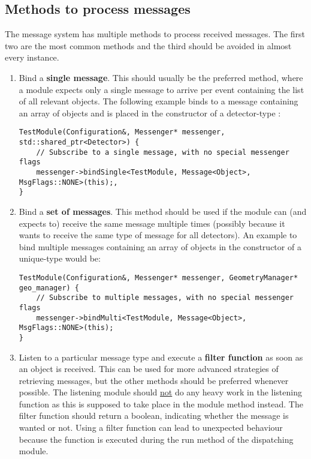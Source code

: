 \subsection{Methods to process messages}
The message system has multiple methods to process received messages.
The first two are the most common methods and the third should be avoided in almost every instance.
\begin{enumerate}
\item Bind a \textbf{single message}.
This should usually be the preferred method, where a module expects only a single message to arrive per event containing the list of all relevant objects.
The following example binds to a message containing an array of objects and is placed in the constructor of a detector-type :
\begin{verbatim}
TestModule(Configuration&, Messenger* messenger, std::shared_ptr<Detector>) {
    // Subscribe to a single message, with no special messenger flags
    messenger->bindSingle<TestModule, Message<Object>, MsgFlags::NONE>(this);,
}
\end{verbatim}
\item Bind a \textbf{set of messages}.
This method should be used if the module can (and expects to) receive the same message multiple times (possibly because it wants to receive the same type of message for all detectors).
An example to bind multiple messages containing an array of objects in the constructor of a unique-type  would be:
\begin{verbatim}
TestModule(Configuration&, Messenger* messenger, GeometryManager* geo_manager) {
    // Subscribe to multiple messages, with no special messenger flags
    messenger->bindMulti<TestModule, Message<Object>, MsgFlags::NONE>(this);
}
\end{verbatim}
\item Listen to a particular message type and execute a \textbf{filter function} as soon as an object is received.
This can be used for more advanced strategies of retrieving messages, but the other methods should be preferred whenever possible.
The listening module should \underline{not} do any heavy work in the listening function as this is supposed to take place in the module  method instead.
The filter function should return a boolean, indicating whether the message is wanted or not.
Using a filter function can lead to unexpected behaviour because the function is executed during the run method of the dispatching module.

\end{enumerate}
